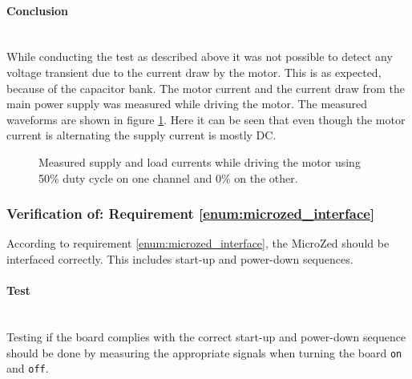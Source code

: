 \paragraph{Conclusion}~\\
While conducting the test as described above it was not possible to detect any voltage transient due to the current draw by the motor.
This is as expected, because of the capacitor bank.
The motor current and the current draw from the main power supply was measured while driving the motor.
The measured waveforms are shown in figure \ref{fig:controllerboardv2_currents}.
Here it can be seen that even though the motor current is alternating the supply current is mostly DC.
\begin{figure}[h]
	\centering
    
	\caption[Measured supply and load currents.]{Measured supply and load currents while driving the motor using 50\% duty cycle on one channel and 0\% on the other.}
	\label{fig:controllerboardv2_currents}
\end{figure}

\subsubsection{Verification of: Requirement \ref{enum:microzed_interface}} %
\label{ssub:requirement_enum:microzed_interface}
According to requirement  \ref{enum:microzed_interface}, the MicroZed should be interfaced correctly. 
This includes start-up and power-down sequences.

\paragraph{Test}~\\

Testing if the board complies with the correct start-up and power-down sequence should be done by measuring the appropriate signals when turning the board \texttt{on} and \texttt{off}.

